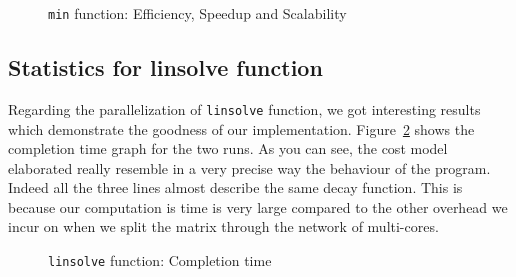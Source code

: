 \begin{figure}[!h]
{  }
  \caption{\texttt{min} function: Efficiency, Speedup and Scalability}
  \label{fig:min-scal-eff}
\end{figure}

\subsection{Statistics for linsolve function}

Regarding the parallelization of \texttt{linsolve} function, we got
interesting results which demonstrate the goodness of our
implementation. Figure~\ref{fig:linsolve-tc} shows the completion time
graph for the two runs. As you can see, the cost model elaborated really
resemble in a very precise way the behaviour of the program. Indeed all
the three lines almost describe the same decay function. This is because
our computation is time is very large compared to the other overhead we
incur on when we split the matrix through the network of multi-cores.

\begin{figure}[!h]
  \caption{\texttt{linsolve} function: Completion time}
  \label{fig:linsolve-tc}
\end{figure}


